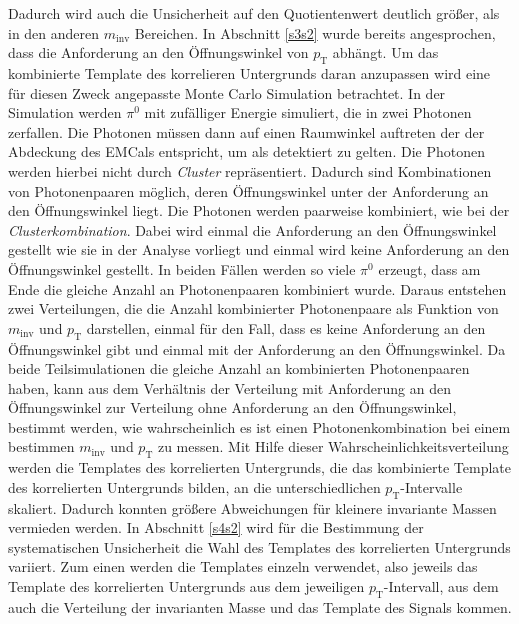 Dadurch wird auch die Unsicherheit auf den Quotientenwert deutlich größer, als in den anderen $m_\text{inv}$ Bereichen.
\newline
In Abschnitt \ref{s3s2} wurde bereits angesprochen, dass die Anforderung an den Öffnungswinkel von $p_\text{T}$ abhängt.
Um das kombinierte Template des korrelieren Untergrunds daran anzupassen wird eine für diesen Zweck angepasste Monte Carlo Simulation betrachtet.
In der Simulation werden $\pi^{0}$ mit zufälliger Energie simuliert, die in zwei Photonen zerfallen.
Die Photonen müssen dann auf einen Raumwinkel auftreten der der Abdeckung des EMCals entspricht, um als detektiert zu gelten.
Die Photonen werden hierbei nicht durch \textit{Cluster} repräsentiert.
Dadurch sind Kombinationen von Photonenpaaren möglich, deren Öffnungswinkel unter der Anforderung an den Öffnungswinkel liegt.
Die Photonen werden paarweise kombiniert, wie bei der \textit{Clusterkombination}.
Dabei wird einmal die Anforderung an den Öffnungswinkel gestellt wie sie in der Analyse vorliegt und einmal wird keine Anforderung an den Öffnungswinkel gestellt.
In beiden Fällen werden so viele $\pi^{0}$ erzeugt, dass am Ende die gleiche Anzahl an Photonenpaaren kombiniert wurde.
Daraus entstehen zwei Verteilungen, die die Anzahl kombinierter Photonenpaare als Funktion von $m_\text{inv}$ und $p_\text{T}$ darstellen, einmal für den Fall, dass es keine Anforderung an den Öffnungswinkel gibt und einmal mit der Anforderung an den Öffnungswinkel.
Da beide Teilsimulationen die gleiche Anzahl an kombinierten Photonenpaaren haben, kann aus dem Verhältnis der Verteilung mit Anforderung an den Öffnungswinkel zur Verteilung ohne Anforderung an den Öffnungswinkel, bestimmt werden, wie wahrscheinlich es ist einen Photonenkombination bei einem bestimmen $m_\text{inv}$ und $p_\text{T}$ zu messen.
Mit Hilfe dieser Wahrscheinlichkeitsverteilung werden die Templates des korrelierten Untergrunds, die das kombinierte Template des korrelierten Untergrunds bilden, an die unterschiedlichen $p_\text{T}$-Intervalle skaliert.
Dadurch konnten größere Abweichungen für kleinere invariante Massen vermieden werden.
\newline
In Abschnitt \ref{s4s2} wird für die Bestimmung der systematischen Unsicherheit die Wahl des Templates des korrelierten Untergrunds variiert.
\newline
Zum einen werden die Templates einzeln verwendet, also jeweils das Template des korrelierten Untergrunds aus dem jeweiligen $p_\text{T}$-Intervall, aus dem auch die Verteilung der invarianten Masse und das Template des Signals kommen.

